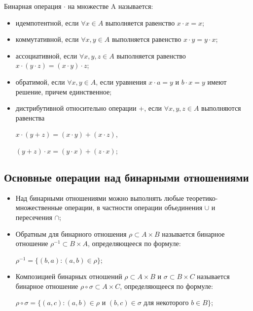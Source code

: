 \documentclass[bachelor, och, labwork]{shiza}
\begin{document}
    Бинарная операция $\cdot$ на множестве A называется:

    \begin{itemize}
        \item идемпотентной, если $\forall x \in A$ выполняется равенство $x \cdot x = x$;

        \item коммутативной, если $\forall x, y \in A$ выполняется равенство $x \cdot y = y \cdot x$;

        \item ассоциативной, если $\forall x, y, z \in A$ выполняется равенство $x \cdot (y \cdot z) = (x \cdot y) \cdot z$;

        \item обратимой, если $\forall x, y \in A$, если уравнения $x \cdot a = y$ и $b \cdot x = y$  имеют решение, причем единственное;
        \item дистрибутивной относительно операции +, если $\forall x, y, z \in A$ выполняются равенства
        
        \begin{center}
            $x \cdot (y + z) = (x \cdot y) + (x \cdot z)$,

            $(y + z) \cdot x = (y \cdot x) + (z \cdot x)$;
        \end{center}
    \end{itemize}

    \subsection{Основные операции над бинарными отношениями}

    \begin{itemize}
        \item Над бинарными отношениями можно выполнять любые теоретико-множественные операции, в частности операции
        объединения $\cup$ и пересечения $\cap$;
        \item Обратным для бинарного отношения $\rho \subset A \times B$ называется бинарное
        отношение $\rho^{-1} \subset B \times A$, определяющееся по формуле:
        \begin{center}
            $\rho^{-1} = \{(b, a) : (a, b) \in \rho \}$;
        \end{center}
        \item Композицией бинарных отношений $\rho \subset A \times B$ и $\sigma \subset B \times C$
        называется бинарное отношение $\rho \circ \sigma \subset A \times C$, определяющееся по формуле:
        \begin{center}
            $\rho \circ \sigma = \{ (a, c) : (a, b) \in \rho \text{ и } (b, c) \in \sigma \text{ для некоторого } b \in B \}$;
        \end{center}
    \end{itemize}
\end{document}
